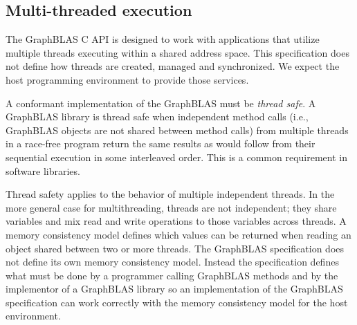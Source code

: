 
\subsection{Multi-threaded execution}
\label{Sec:MultiThread}

The GraphBLAS C API is designed to work with applications that
utilize multiple threads executing within a shared address space.
This specification does not define how threads are created, managed and
synchronized.  We expect the host programming environment to provide
those services. 

A conformant implementation of the GraphBLAS must be \emph{thread safe}.  A 
GraphBLAS library is thread safe when independent method calls (i.e., GraphBLAS 
objects are not shared between method calls) from multiple threads in a race-free 
program return the same results as would follow from their sequential execution 
in some interleaved order.   This is a common requirement in software libraries. 

Thread safety applies to the behavior of multiple independent threads.  In the 
more general case for multithreading, threads are not independent; they share 
variables and mix read and write operations to those variables across threads.  
A memory consistency model defines which values can be returned when reading an 
object shared between two or more threads.  The GraphBLAS specification does not 
define its own memory consistency model. Instead the specification defines what 
must be done by a programmer calling GraphBLAS methods and by the implementor of 
a GraphBLAS library so an implementation of the GraphBLAS specification can work 
correctly with the memory consistency model for the host environment. 

